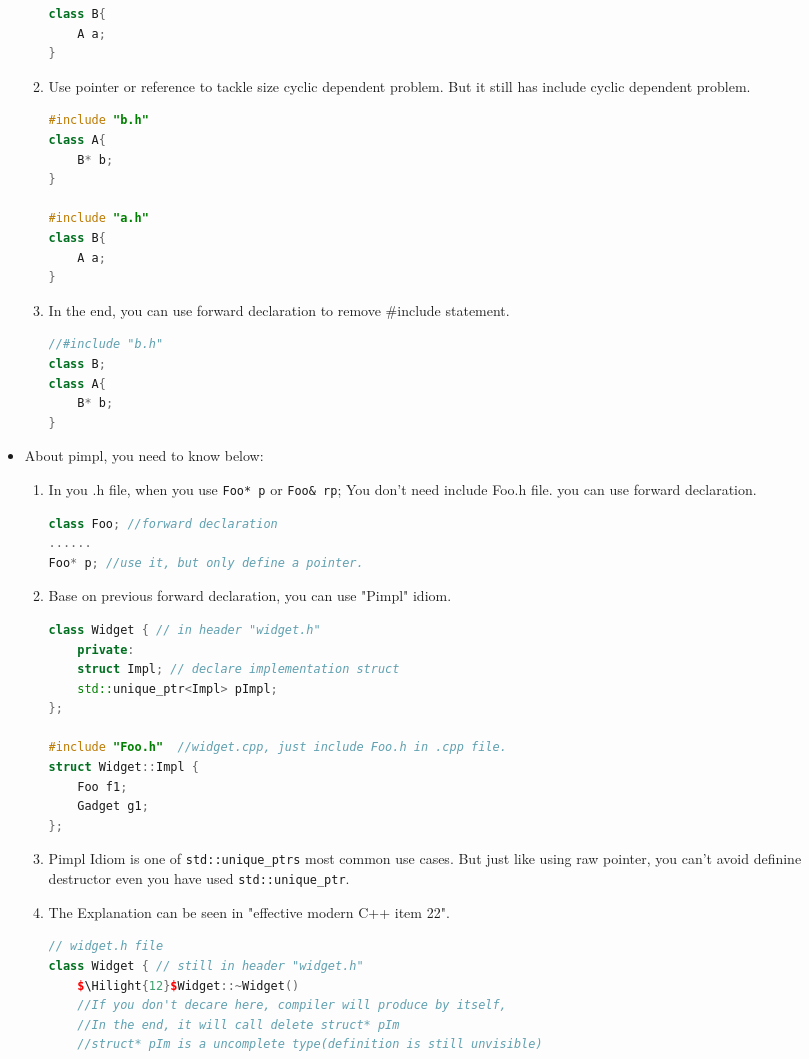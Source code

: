 \documentclass[a4paper,11pt,twoside]{book}
\newcommand{\Hilight}[1]{\makebox[0pt][l]{\color{yellow}\rule[-3pt]{#1em}{11pt}}}
\newcommand{\Hilight}[1]{}
\begin{document}
\begin{itemize}
\begin{enumerate}
\begin{lstlisting}[frame=single, language=c++]
class B{
	A a;
}
\end{lstlisting}
		\item Use pointer or reference to tackle size cyclic dependent problem. But it still has include cyclic dependent problem. 
\begin{lstlisting}[frame=single, language=c++]
#include "b.h"
class A{
	B* b;
}
		
#include "a.h"
class B{
	A a;
}
\end{lstlisting}
		\item In the end, you can use forward declaration to remove \#include statement. 
\begin{lstlisting}[frame=single, language=c++]
//#include "b.h"
class B;
class A{
	B* b;
}
\end{lstlisting}
	\end{enumerate}
	
	\item About pimpl, you need to know below:
	\begin{enumerate}
		\item In you .h file, when you use \texttt{Foo* p} or \texttt{Foo\& rp}; You don't need include Foo.h file. you can use forward declaration.
\begin{lstlisting}[frame=single, language=c++]
class Foo; //forward declaration
......
Foo* p; //use it, but only define a pointer.
\end{lstlisting}
		
		\item Base on previous forward declaration, you can use "Pimpl" idiom.
\begin{lstlisting}[frame=single, language=c++]
class Widget { // in header "widget.h"
	private:
	struct Impl; // declare implementation struct
	std::unique_ptr<Impl> pImpl;
};
		
#include "Foo.h"  //widget.cpp, just include Foo.h in .cpp file.
struct Widget::Impl {
	Foo f1;
	Gadget g1;
};
\end{lstlisting}
		
		\item Pimpl Idiom is one of \texttt{std::unique\_ptrs} most common use cases. But just like using raw pointer,  you can't avoid definine destructor even you have used \texttt{std::unique\_ptr}. 
		
		\item The Explanation can be seen in "effective modern C++ item 22". 
\begin{lstlisting}[frame=single, language=c++, mathescape=true]
// widget.h file
class Widget { // still in header "widget.h"
	$\Hilight{12}$Widget::~Widget()
	//If you don't decare here, compiler will produce by itself,
	//In the end, it will call delete struct* pIm
	//struct* pIm is a uncomplete type(definition is still unvisible)


\end{lstlisting}
\end{enumerate}
\end{itemize}
\end{document}
